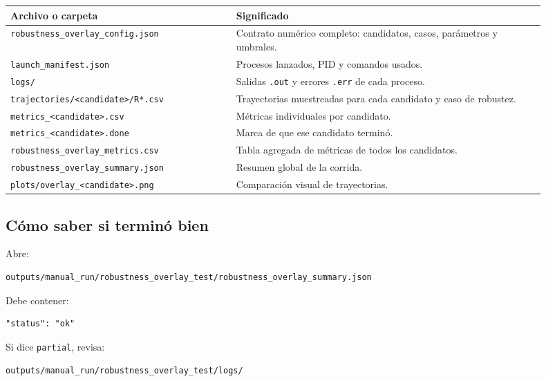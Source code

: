 \documentclass[11pt,letterpaper]{article}
\begin{document}
\begin{center}
\begin{tabular}{L{0.38\linewidth}L{0.52\linewidth}}
\toprule
Archivo o carpeta & Significado \\
\midrule
\texttt{robustness\_overlay\_config.json} & Contrato numérico completo: candidatos, casos, parámetros y umbrales. \\
\texttt{launch\_manifest.json} & Procesos lanzados, PID y comandos usados. \\
\texttt{logs/} & Salidas \texttt{.out} y errores \texttt{.err} de cada proceso. \\
\texttt{trajectories/<candidate>/R*.csv} & Trayectorias muestreadas para cada candidato y caso de robustez. \\
\texttt{metrics\_<candidate>.csv} & Métricas individuales por candidato. \\
\texttt{metrics\_<candidate>.done} & Marca de que ese candidato terminó. \\
\texttt{robustness\_overlay\_metrics.csv} & Tabla agregada de métricas de todos los candidatos. \\
\texttt{robustness\_overlay\_summary.json} & Resumen global de la corrida. \\
\texttt{plots/overlay\_<candidate>.png} & Comparación visual de trayectorias. \\
\bottomrule
\end{tabular}
\end{center}

\subsection{Cómo saber si terminó bien}

Abre:

\begin{lstlisting}[style=terminal]
outputs/manual_run/robustness_overlay_test/robustness_overlay_summary.json
\end{lstlisting}

Debe contener:

\begin{lstlisting}[style=terminal]
"status": "ok"
\end{lstlisting}

Si dice \texttt{partial}, revisa:

\begin{lstlisting}[style=terminal]
outputs/manual_run/robustness_overlay_test/logs/
\end{lstlisting}
\end{document}
